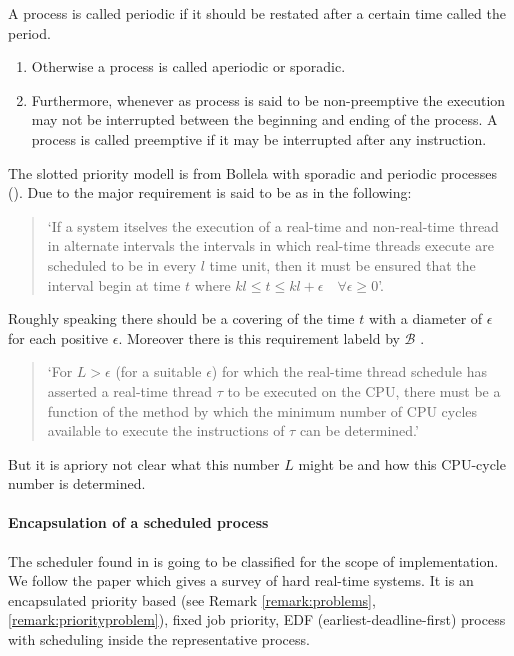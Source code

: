\begin{definition}
	 A process is called periodic if it should be restated after a certain time called the period.
	 \begin{enumerate}[label=(\roman*)] 
	\item Otherwise a process is called aperiodic or sporadic.
	\item Furthermore, whenever as process is said to be non-preemptive the execution may not be interrupted between the beginning and ending of the process. 
		A process is called preemptive if it may be interrupted after any instruction.
	\end{enumerate}
	\end{definition}  
 
The slotted priority modell is from Bollela \cite{B97} with  sporadic and periodic processes (\cite{K}).
Due to \cite{B97} the major requirement is said to be as in the following:

\begin{quote}
	`If a system itselves the execution of a real-time and non-real-time thread in alternate intervals the intervals in which real-time threads execute are scheduled to be in every $l$ time unit, then it must be ensured that the interval begin at time $t$ where $kl \leq t \leq kl+\epsilon \quad \forall
 \epsilon \geq 0$'.
\end{quote}

Roughly speaking there should be a covering of the time $t$ with a diameter of $\epsilon$ for each positive $\epsilon$.
Moreover there is this requirement labeld by  $\mathcal{B}$ \cite{B97}.
\begin{quote}
	`For $L>\epsilon$ (for a suitable $\epsilon$) for which the real-time thread schedule has asserted a real-time thread $\tau$ to be executed on the CPU, there must be a function of the method by which the minimum number of CPU cycles available to execute the instructions of $\tau$ can be determined.'
\end{quote}
But it is apriory not clear what this number $L$ might be and how this CPU-cycle number is determined.


\paragraph*{Encapsulation of a scheduled process}
 
	The scheduler found in \cite{K} is going to be classified for the scope of implementation. 
	We follow the paper \cite{DB2011} which gives a survey of hard real-time systems.
	It is an encapsulated priority based (see Remark \ref{remark:problems}, \ref{remark:priorityproblem}), fixed job priority,   EDF (earliest-deadline-first) process with scheduling inside the representative process.


